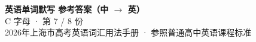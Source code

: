 \documentclass[10pt,a4paper]{article}
\begin{document}
\pagestyle{plain}

\begin{center}
{\LARGE\bfseries 英语单词默写 \quad 参考答案（中 $\to$ 英）}\\[0.22em]
{\large C 字母 · 第 7 / 8 份}\\[0.18em]
{\small 2026年上海市高考英语词汇用法手册 · 参照普通高中英语课程标准}
\end{center}

\vspace{0.2em}
\noindent{\color{rulegray}\rule{\textwidth}{0.8pt}}

\vspace{0.35em}

\vspace{0.25em}
\renewcommand{\arraystretch}{1.32}
\end{document}
